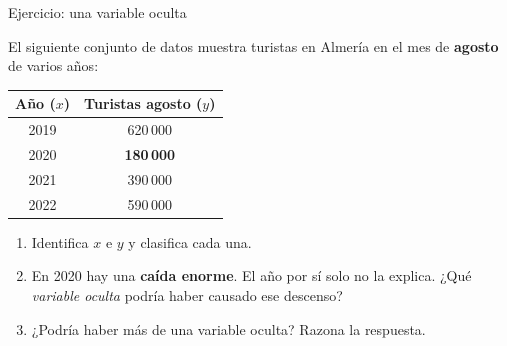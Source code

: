 \documentclass[aspectratio=169, 10pt, spanish]{beamer}
\begin{document}
\begin{frame}{Ejercicio: una variable oculta}
  \begin{analizarbox}
    El siguiente conjunto de datos muestra turistas en Almería
    en el mes de \textbf{agosto} de varios años:

    \vspace{0.2cm}
    \begin{center}
    \AlmFontSmall
    \begin{tabular}{cc}
      \toprule
      \textbf{Año (\(x\))} & \textbf{Turistas agosto (\(y\))} \\
      \midrule
      2019 & 620\,000 \\
      2020 & \textcolor{AlmTerra}{\textbf{180\,000}} \\
      2021 & 390\,000 \\
      2022 & 590\,000 \\
      \bottomrule
    \end{tabular}
    \end{center}

    \vspace{0.2cm}
    \begin{enumerate}
      \item Identifica \(x\) e \(y\) y clasifica cada una.
      \item En 2020 hay una \textbf{caída enorme}.
            El año por sí solo no la explica.
            ¿Qué \textit{variable oculta} podría haber causado ese descenso?
      \item ¿Podría haber más de una variable oculta?
            Razona la respuesta.
    \end{enumerate}
  \end{analizarbox}
\end{frame}
\end{document}

